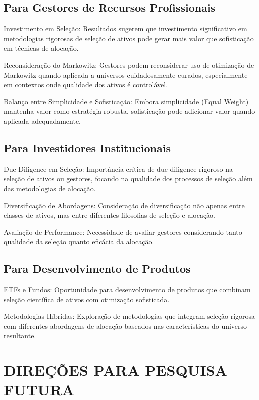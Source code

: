 \subsection{Para Gestores de Recursos Profissionais}

Investimento em Seleção: Resultados sugerem que investimento significativo em metodologias rigorosas de seleção de ativos pode gerar mais valor que sofisticação em técnicas de alocação.

Reconsideração do Markowitz: Gestores podem reconsiderar uso de otimização de Markowitz quando aplicada a universos cuidadosamente curados, especialmente em contextos onde qualidade dos ativos é controlável.

Balanço entre Simplicidade e Sofisticação: Embora simplicidade (Equal Weight) mantenha valor como estratégia robusta, sofisticação pode adicionar valor quando aplicada adequadamente.

\subsection{Para Investidores Institucionais}

Due Diligence em Seleção: Importância crítica de due diligence rigoroso na seleção de ativos ou gestores, focando na qualidade dos processos de seleção além das metodologias de alocação.

Diversificação de Abordagens: Consideração de diversificação não apenas entre classes de ativos, mas entre diferentes filosofias de seleção e alocação.

Avaliação de Performance: Necessidade de avaliar gestores considerando tanto qualidade da seleção quanto eficácia da alocação.

\subsection{Para Desenvolvimento de Produtos}

ETFs e Fundos: Oportunidade para desenvolvimento de produtos que combinam seleção científica de ativos com otimização sofisticada.

Metodologias Híbridas: Exploração de metodologias que integram seleção rigorosa com diferentes abordagens de alocação baseados nas características do universo resultante.

\section{DIREÇÕES PARA PESQUISA FUTURA}

